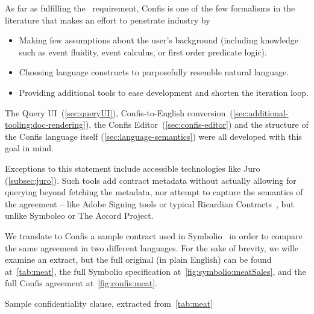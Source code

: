 As far as fulfilling the~ requirement, Confis is one of the few formalisms in the literature that makes an effort to penetrate industry by
\begin{itemize}
    \item Making few assumptions about the user's background (including knowledge such as event fluidity, event calculus, or first order predicate logic).
    \item Choosing language constructs to purposefully resemble natural language.
    \item Providing additional tools to ease development and shorten the iteration loop.
\end{itemize}

The Query UI~(\autoref{sec:queryUI}), Confis-to-English conversion~(\autoref{sec:additional-tooling:doc-rendering}), the Confis Editor~(\autoref{sec:confis-editor}) and the structure of the Confis language itself (\autoref{sec:language-semantics}) were all developed with this goal in mind.

Exceptions to this statement include accessible technologies like Juro (\autoref{subsec:juro}).
Such tools add contract metadata without actually allowing for querying beyond fetching the metadata, nor attempt to capture the semantics of the agreement -- like Adobe Signing tools or typical Ricardian Contracts~\cite{ricardianWeb}, but unlike Symboleo or The Accord Project.

We translate to Confis a sample contract used in Symbolio~\cite{symboleo2020} in order to compare the same agreement in two different languages.
For the sake of brevity, we wille examine an extract, but the full original (in plain English) can be found at~\autoref{tab:meat}, the full Symbolio specification at~\autoref{fig:symbolio:meatSales}, and the full Confis agreement at~\autoref{fig:confis:meat}.

\begin{table}[h]
    \centering
    \setlength{\fboxsep}{10pt}
    \caption[Sample confidentiality clause]{Sample confidentiality clause, extracted from~\autoref{tab:meat}}
    \label{tab:meat-confidentiality}
\end{table}

